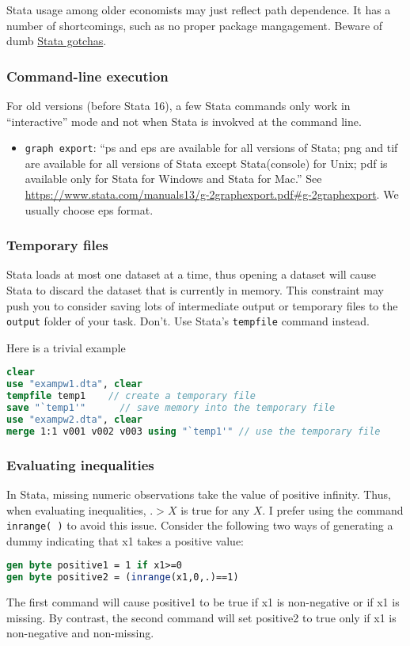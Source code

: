 Stata usage among older economists may just reflect path dependence.
It has a number of shortcomings, such as no proper package mangagement.
Beware of dumb \href{https://ifs.org.uk/docs/stata_gotchasJan2014.pdf}{Stata gotchas}.

\subsubsection{Command-line execution}

For old versions (before Stata 16), a few Stata commands only work in ``interactive'' mode and not when Stata is invokved at the command line.
\begin{itemize}
	\item \texttt{graph export}:
	``ps and eps are available for all versions of Stata; png and tif are available for all versions of Stata except Stata(console) for Unix; pdf is available only for Stata for Windows and Stata for Mac.''
	See \url{https://www.stata.com/manuals13/g-2graphexport.pdf#g-2graphexport}.
	We usually choose eps format.
\end{itemize}


\subsubsection{Temporary files}
Stata loads at most one dataset at a time,
thus opening a dataset will cause Stata to discard the dataset that is currently in memory.
This constraint may push you to consider saving lots of intermediate output or temporary files to the \texttt{output} folder of your task.
Don't.
Use Stata's \texttt{tempfile} command instead.

Here is a trivial example
\begin{lstlisting}[language=Stata]
clear
use "exampw1.dta", clear
tempfile temp1    // create a temporary file
save "`temp1'"      // save memory into the temporary file
use "exampw2.dta", clear
merge 1:1 v001 v002 v003 using "`temp1'" // use the temporary file
\end{lstlisting}

\subsubsection{Evaluating inequalities}
In Stata, missing numeric observations take the value of positive infinity.
Thus, when evaluating inequalities, $.>X$ is true for any $X$.
I prefer using the command \texttt{inrange( )} to avoid this issue.
Consider the following two ways of generating a dummy indicating that x1 takes a positive value:
\begin{lstlisting}[language=Stata]
gen byte positive1 = 1 if x1>=0
gen byte positive2 = (inrange(x1,0,.)==1)
\end{lstlisting}
The first command will cause positive1 to be true if x1 is non-negative or if x1 is missing.
By contrast, the second command will set positive2 to true only if x1 is non-negative and non-missing.
